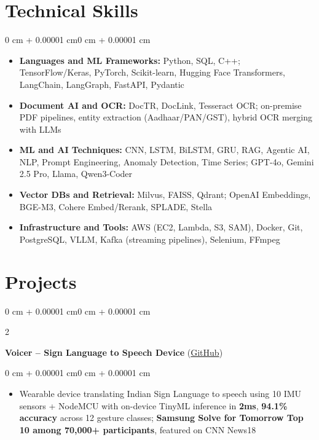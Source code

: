 \documentclass[10pt, letterpaper]{article}
\newenvironment{highlights}{
    \begin{itemize}[
        topsep=0.01 cm,
        parsep=0.01 cm,
        partopsep=0pt,
        itemsep=0pt,
        leftmargin=0 cm + 10pt
    ]
}{
    \end{itemize}
}
\newenvironment{highlightsforbulletentries}{
    \begin{itemize}[
        topsep=0.01 cm,
        parsep=0.01 cm,
        partopsep=0pt,
        itemsep=0pt,
        leftmargin=10pt
    ]
}{
    \end{itemize}
}
\newenvironment{onecolentry}{
    \begin{adjustwidth}{0 cm + 0.00001 cm}{0 cm + 0.00001 cm}
}{
    \end{adjustwidth}
}
\newenvironment{twocolentry}[2][]{
    \onecolentry
    \def\secondColumn{#2}
    \setcolumnwidth{\fill, 5.5 cm}
    \begin{paracol}{2}
}{
    \switchcolumn \raggedleft \secondColumn
    \end{paracol}
    \endonecolentry
}
\let\hrefWithoutArrow\href
\begin{document}
    \section{Technical Skills}

    \begin{onecolentry}
        \begin{highlightsforbulletentries}
            \item \textbf{Languages and ML Frameworks:} Python, SQL, C++; TensorFlow/Keras, PyTorch, Scikit-learn, Hugging Face Transformers, LangChain, LangGraph, FastAPI, Pydantic
            \item \textbf{Document AI and OCR:} DocTR, DocLink, Tesseract OCR; on-premise PDF pipelines, entity extraction (Aadhaar/PAN/GST), hybrid OCR merging with LLMs
            \item \textbf{ML and AI Techniques:} CNN, LSTM, BiLSTM, GRU, RAG, Agentic AI, NLP, Prompt Engineering, Anomaly Detection, Time Series; GPT-4o, Gemini 2.5 Pro, Llama, Qwen3-Coder
            \item \textbf{Vector DBs and Retrieval:} Milvus, FAISS, Qdrant; OpenAI Embeddings, BGE-M3, Cohere Embed/Rerank, SPLADE, Stella
            \item \textbf{Infrastructure and Tools:} AWS (EC2, Lambda, S3, SAM), Docker, Git, PostgreSQL, VLLM, Kafka (streaming pipelines), Selenium, FFmpeg
        \end{highlightsforbulletentries}
    \end{onecolentry}

    \section{Projects}

        \begin{twocolentry}{
            2023
        }
            \textbf{Voicer -- Sign Language to Speech Device} (\hrefWithoutArrow{https://github.com/amit-gohel/voicer}{GitHub})
        \end{twocolentry}

        \vspace{0.02 cm}
        \begin{onecolentry}
            \begin{highlights}
                \item Wearable device translating Indian Sign Language to speech using 10 IMU sensors + NodeMCU with on-device TinyML inference in \textbf{2ms}, \textbf{94.1\% accuracy} across 12 gesture classes; \textbf{Samsung Solve for Tomorrow Top 10 among 70,000+ participants}, featured on CNN News18
            \end{highlights}
        \end{onecolentry}
\end{document}
